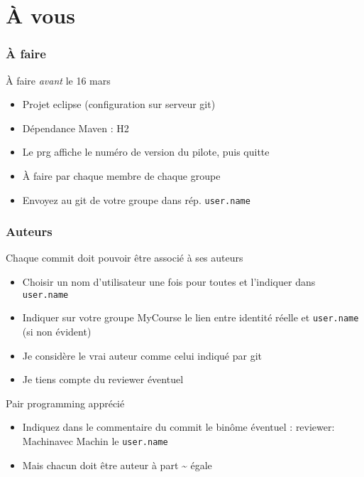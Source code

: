 \documentclass[english, french]{beamer}
\begin{document}
\section{À vous}
\begin{frame}
	\frametitle{À faire}
	\begin{block}{À faire \emph{avant} le 16 mars}
		\begin{itemize}
			\item Projet eclipse (configuration sur serveur git)
			\item Dépendance Maven : H2
			\item Le prg affiche le numéro de version du pilote, puis quitte
			\item À faire par chaque membre de chaque groupe
			\item Envoyez au git de votre groupe dans rép. \texttt{user.name}
		\end{itemize}
	\end{block}
\end{frame}

\begin{frame}
	\frametitle{Auteurs}
	Chaque commit doit pouvoir être associé à ses auteurs
	\begin{itemize}
		\item Choisir un nom d’utilisateur \alert{une fois pour toutes} et l’indiquer dans \texttt{user.name}
		\item Indiquer sur votre groupe MyCourse le lien entre identité réelle et \texttt{user.name} (si non évident)
		\item Je considère le vrai auteur comme celui indiqué par git
		\item Je tiens compte du reviewer éventuel
	\end{itemize}
	Pair programming apprécié
	\begin{itemize}
		\item Indiquez dans le commentaire du commit le binôme éventuel : \og\alert{reviewer: Machin}\fg avec Machin le \texttt{user.name}
		\item Mais chacun doit être auteur à part \sim{} égale
	\end{itemize}
\end{frame}

\end{document}
